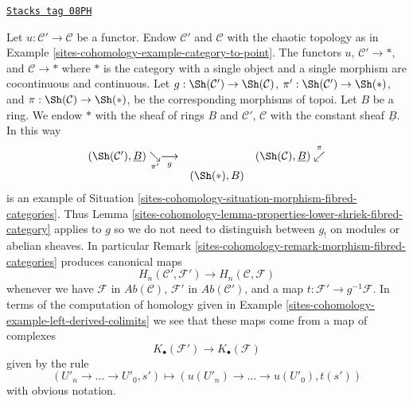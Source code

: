 \begin{example}
\label{sites-cohomology-example-morphism-categories}
\href{https://stacks.math.columbia.edu/tag/08PH}{\texttt{Stacks tag 08PH}}

Let $u : \mathcal{C}' \to \mathcal{C}$ be a functor.
Endow $\mathcal{C}'$ and $\mathcal{C}$ with the chaotic
topology as in Example \ref{sites-cohomology-example-category-to-point}.
The functors $u$, $\mathcal{C}' \to *$, and $\mathcal{C} \to *$
where $*$ is the category with a single object and a single morphism
are cocontinuous and continuous. Let
$g : \Sh(\mathcal{C}') \to \Sh(\mathcal{C})$,
$\pi' : \Sh(\mathcal{C}') \to \Sh(*)$, and
$\pi : \Sh(\mathcal{C}) \to \Sh(*)$,
be the corresponding morphisms of topoi.
Let $B$ be a ring. We endow $*$ with the sheaf of rings $B$ and
$\mathcal{C}'$, $\mathcal{C}$ with the constant sheaf $\underline{B}$.
In this way
$$
\begin{array}{ccc}(\Sh(\mathcal{C}'), \underline{B}) \underset{\pi'}{\searrow}\underset{g}{\longrightarrow} &  & (\Sh(\mathcal{C}), \underline{B}) \overset{\pi}{\swarrow} \\  & (\Sh(*), B) & \end{array}
$$
is an example of Situation \ref{sites-cohomology-situation-morphism-fibred-categories}.
Thus
Lemma \ref{sites-cohomology-lemma-properties-lower-shriek-fibred-category}
applies to $g$ so we do not need to distinguish between $g_!$ on
modules or abelian sheaves. In particular
Remark \ref{sites-cohomology-remark-morphism-fibred-categories}
produces canonical maps
$$
H_n(\mathcal{C}', \mathcal{F}')
\longrightarrow
H_n(\mathcal{C}, \mathcal{F})
$$
whenever we have $\mathcal{F}$ in $\textit{Ab}(\mathcal{C})$,
$\mathcal{F}'$ in $\textit{Ab}(\mathcal{C}')$,
and a map $t : \mathcal{F}' \to g^{-1}\mathcal{F}$. In terms of the
computation of homology given in
Example \ref{sites-cohomology-example-left-derived-colimits}
we see that these maps come from a map of complexes
$$
K_\bullet(\mathcal{F}') \longrightarrow K_\bullet(\mathcal{F})
$$
given by the rule
$$
(U'_n \to \ldots \to U'_0, s') \longmapsto
(u(U'_n) \to \ldots \to u(U'_0), t(s'))
$$
with obvious notation.
\end{example}

